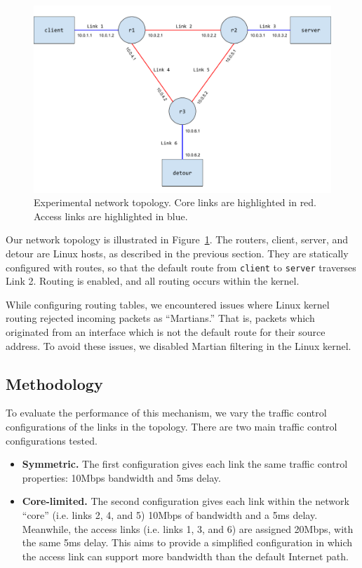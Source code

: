 \documentclass{cwru}
\begin{document}
\begin{figure}
  \centering
  \includegraphics[width=\textwidth]{figures/Topology.pdf}
  \caption[Experimental network topology]{Experimental network topology. Core
    links are highlighted in red. Access links are highlighted in blue.}
  \label{fig:topo}
\end{figure}

Our network topology is illustrated in Figure~\ref{fig:topo}. The routers,
client, server, and detour are Linux hosts, as described in the previous
section. They are statically configured with routes, so that the default route
from \texttt{client} to \texttt{server} traverses Link 2. Routing is enabled,
and all routing occurs within the kernel.

While configuring routing tables, we encountered issues where Linux kernel
routing rejected incoming packets as ``Martians.'' That is, packets which
originated from an interface which is not the default route for their source
address. To avoid these issues, we disabled Martian filtering in the Linux
kernel.

\subsection{Methodology}

To evaluate the performance of this mechanism, we vary the traffic control
configurations of the links in the topology. There are two main traffic control
configurations tested.

\begin{itemize}
\item \textbf{Symmetric.} The first configuration gives each link the same
  traffic control properties: 10Mbps bandwidth and 5ms delay.
\item \textbf{Core-limited.} The second configuration gives each link within the
  network ``core'' (i.e. links 2, 4, and 5) 10Mbps of bandwidth and a 5ms delay.
  Meanwhile, the access links (i.e. links 1, 3, and 6) are assigned 20Mbps, with
  the same 5ms delay. This aims to provide a simplified configuration in which
  the access link can support more bandwidth than the default Internet path.
\end{itemize}
\end{document}
